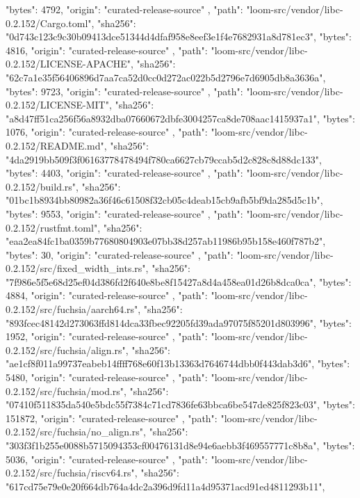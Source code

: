 {{      "bytes": 4792,
      "origin": "curated-release-source"
    },
    {
      "path": "loom-src/vendor/libc-0.2.152/Cargo.toml",
      "sha256": "0d743c123c9c30b09413dce51344d4dfaf958e8eef3e1f4e7682931a8d781ec3",
      "bytes": 4816,
      "origin": "curated-release-source"
    },
    {
      "path": "loom-src/vendor/libc-0.2.152/LICENSE-APACHE",
      "sha256": "62c7a1e35f56406896d7aa7ca52d0cc0d272ac022b5d2796e7d6905db8a3636a",
      "bytes": 9723,
      "origin": "curated-release-source"
    },
    {
      "path": "loom-src/vendor/libc-0.2.152/LICENSE-MIT",
      "sha256": "a8d47ff51ca256f56a8932dba07660672dbfe3004257ca8de708aac1415937a1",
      "bytes": 1076,
      "origin": "curated-release-source"
    },
    {
      "path": "loom-src/vendor/libc-0.2.152/README.md",
      "sha256": "4da2919bb509f3f06163778478494f780ca6627cb79ccab5d2c828c8d88dc133",
      "bytes": 4403,
      "origin": "curated-release-source"
    },
    {
      "path": "loom-src/vendor/libc-0.2.152/build.rs",
      "sha256": "01bc1b8934bb80982a36f46c61508f32cb05c4deab15cb9afb5bf9da285d5c1b",
      "bytes": 9553,
      "origin": "curated-release-source"
    },
    {
      "path": "loom-src/vendor/libc-0.2.152/rustfmt.toml",
      "sha256": "eaa2ea84fc1ba0359b77680804903e07bb38d257ab11986b95b158e460f787b2",
      "bytes": 30,
      "origin": "curated-release-source"
    },
    {
      "path": "loom-src/vendor/libc-0.2.152/src/fixed_width_ints.rs",
      "sha256": "7f986e5f5e68d25ef04d386fd2f640e8be8f15427a8d4a458ea01d26b8dca0ca",
      "bytes": 4884,
      "origin": "curated-release-source"
    },
    {
      "path": "loom-src/vendor/libc-0.2.152/src/fuchsia/aarch64.rs",
      "sha256": "893fcec48142d273063ffd814dca33fbec92205fd39ada97075f85201d803996",
      "bytes": 1952,
      "origin": "curated-release-source"
    },
    {
      "path": "loom-src/vendor/libc-0.2.152/src/fuchsia/align.rs",
      "sha256": "ae1cf8f011a99737eabeb14ffff768e60f13b13363d7646744dbb0f443dab3d6",
      "bytes": 5480,
      "origin": "curated-release-source"
    },
    {
      "path": "loom-src/vendor/libc-0.2.152/src/fuchsia/mod.rs",
      "sha256": "07410f511835da540e5bdc55f7384c71cd7836fe63bbca6be547de825f823c03",
      "bytes": 151872,
      "origin": "curated-release-source"
    },
    {
      "path": "loom-src/vendor/libc-0.2.152/src/fuchsia/no_align.rs",
      "sha256": "303f3f1b255e0088b5715094353cf00476131d8e94e6aebb3f469557771c8b8a",
      "bytes": 5036,
      "origin": "curated-release-source"
    },
    {
      "path": "loom-src/vendor/libc-0.2.152/src/fuchsia/riscv64.rs",
      "sha256": "617cd75e79e0e20f664db764a4dc2a396d9fd11a4d95371acd91ed4811293b11",
}}
